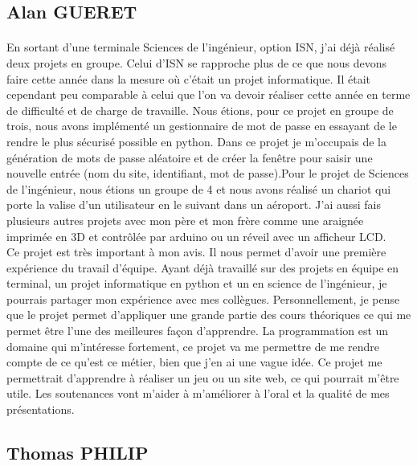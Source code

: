 \documentclass[12pt]{report}
\begin{document}
		\subsection{Alan GUERET}
		\paragraph{}
		
			En sortant d'une terminale Sciences de l'ingénieur, option ISN, j'ai déjà réalisé deux projets en groupe. Celui d'ISN se rapproche plus de ce que nous devons faire cette année dans la mesure où c'était un projet informatique. Il était cependant peu comparable à celui que l'on va devoir réaliser cette année en terme de difficulté et de charge de travaille. Nous étions, pour ce projet en groupe de trois, nous avons implémenté un gestionnaire de mot de passe en essayant de le rendre le plus sécurisé possible en python. Dans ce projet je m'occupais de la génération de mots de passe aléatoire et de créer la fenêtre pour saisir une nouvelle entrée (nom du site, identifiant, mot de passe).Pour le projet de Sciences de l'ingénieur, nous étions un groupe de 4 et nous avons réalisé un chariot qui porte la valise d'un utilisateur en le suivant dans un aéroport. J'ai aussi fais plusieurs autres projets avec mon père et mon frère comme une araignée imprimée en 3D et contrôlée par arduino ou un réveil avec un afficheur LCD.\\

Ce projet est très important à mon avis. Il nous permet d'avoir une première expérience du travail d'équipe. Ayant déjà travaillé sur des projets en équipe en terminal, un projet
informatique en python et un en science de l'ingénieur, je pourrais partager mon expérience avec mes collègues. Personnellement, je pense que le projet permet d'appliquer une grande partie des cours théoriques ce qui me permet être l'une des meilleures façon d'apprendre. La programmation est un domaine qui m'intéresse fortement, ce projet va me permettre de me rendre compte de ce qu'est ce métier, bien que j'en ai une vague idée. Ce projet me permettrait d'apprendre à réaliser un jeu ou un site web, ce qui pourrait m'être utile. Les soutenances vont m'aider à m'améliorer à l'oral et la qualité de mes présentations. 

		
		\subsection{Thomas PHILIP}
\end{document}
